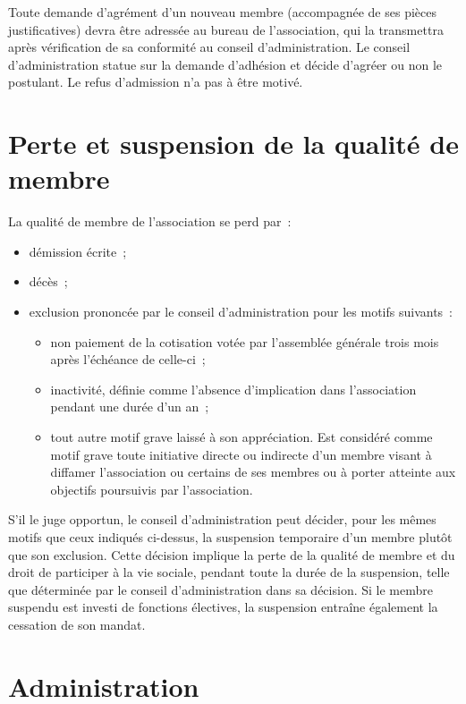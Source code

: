 \documentclass[12 pt]{article}
\begin{document}
Toute demande d'agrément d'un nouveau membre (accompagnée de ses
pièces justificatives) devra être adressée au bureau de l'association,
qui la transmettra après vérification de sa conformité au conseil
d'administration. Le conseil d'administration statue sur la demande
d'adhésion et décide d'agréer ou non le postulant. Le refus
d'admission n'a pas à être motivé.

\section{Perte et suspension de la qualité de membre}
\label{sec:perte-et-suspension-de-la-qualite-de-membre}

La qualité de membre de l'association se perd par :

\begin{itemize}
\item démission écrite~;
\item décès~;
\item exclusion prononcée par le conseil d'administration pour les
  motifs suivants~:
  \begin{itemize}
  \item non paiement de la cotisation votée par l'assemblée générale
    trois mois après l'échéance de celle-ci~;
  \item inactivité, définie comme l'absence d'implication dans
    l'association pendant une durée d'un an~;
  \item tout autre motif grave laissé à son appréciation. Est
    considéré comme motif grave toute initiative directe ou indirecte
    d'un membre visant à diffamer l'association ou certains de ses
    membres ou à porter atteinte aux objectifs poursuivis par
    l'association.
  \end{itemize}
\end{itemize}

S'il le juge opportun, le conseil d'administration peut décider, pour
les mêmes motifs que ceux indiqués ci-dessus, la suspension temporaire
d'un membre plutôt que son exclusion.  Cette décision implique la
perte de la qualité de membre et du droit de participer à la vie
sociale, pendant toute la durée de la suspension, telle que déterminée
par le conseil d'administration dans sa décision. Si le membre
suspendu est investi de fonctions électives, la suspension entraîne
également la cessation de son mandat.

\section{Administration}
\label{sec:administration}
\end{document}
